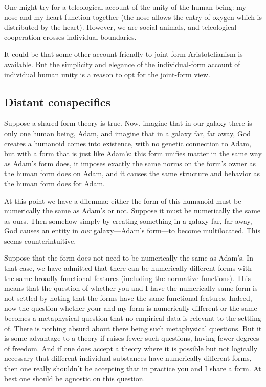 One might try for a teleological account of the unity of the human being: my nose and my heart function together (the nose 
allows the entry of oxygen which is distributed by the heart). However, we are social animals, and teleological cooperation
crosses individual boundaries.

It could be that some other account friendly to joint-form Aristotelianism is available. But the simplicity and elegance of the
individual-form account of individual human unity is a reason to opt for the joint-form view.

\subsection{Distant conspecifics}
Suppose a shared form theory is true. Now, imagine that in our galaxy there is only one human being, Adam, and imagine that in 
a galaxy far, far away, God creates a humanoid comes into existence, with no genetic connection to Adam, but with a form that 
is just like Adam's: this form unifies matter in the same way as
Adam's form does, it imposes exactly the same norms on the form's owner as the human form does on Adam, and it causes the same
structure and behavior as the human form does for Adam. 

At this point we have a dilemma: either the form of this humanoid must be numerically the same as Adam's or not. Suppose it 
must be numerically the same as ours. Then somehow simply by creating something in a galaxy far, far away, God causes an
entity in \textit{our} galaxy---Adam's form---to become multilocated. This seems counterintuitive. 

Suppose that the form does not need to be numerically the same as Adam's. In that case, we have admitted that there can 
be numerically different forms with the same broadly functional features (including the normative functions). This 
means that the question of whether you and I have the  numerically same form is not settled by noting that the forms have 
the same functional features. Indeed, now the question whether your and my form is numerically different or the same becomes
a metaphysical question that no empirical data is relevant to the settling of. There is nothing absurd about there being
such metaphysical questions. But it is some advantage to a theory if raises fewer such questions, having fewer degrees of 
freedom. And if one does accept a theory where it is possible but not logically necessary that different individual substances
have numerically different forms, then one really shouldn't be accepting that in practice you and I share a form. At best
one should be agnostic on this question.

